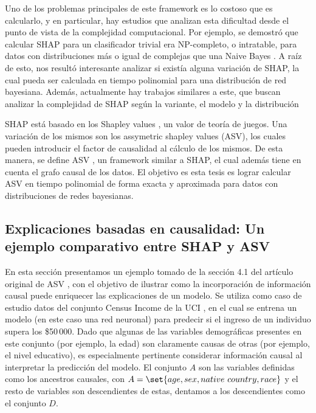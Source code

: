 Uno de los problemas principales de este framework es lo costoso que es calcularlo, y en particular, hay estudios que analizan esta dificultad desde el punto de vista de la complejidad computacional. Por ejemplo, se demostró que calcular SHAP para un clasificador trivial era NP-completo, o intratable, para datos con distribuciones más o igual de complejas que una Naive Bayes \cite{arenas2021tractability}.
A raíz de esto, nos resultó interesante analizar si existía alguna variación de SHAP, la cual pueda ser calculada en tiempo polinomial para una distribución de red bayesiana. Además, actualmente hay trabajos similares a este, que buscan analizar la complejidad de SHAP según la variante, el modelo y la distribución \cite{marzouk2025computationaltractabilitymanyshapley} %

SHAP está basado en los Shapley values \cite{shapley1953value}, un valor de teoría de juegos.  Una variación de los mismos son los assymetric shapley values (ASV), los cuales pueden introducir el factor de causalidad al cálculo de los mismos. De esta manera, se define ASV \cite{frye2019asymmetric}, un framework similar a SHAP, el cual además tiene en cuenta el grafo causal de los datos. El objetivo es esta tesis es lograr calcular ASV en tiempo polinomial de forma exacta y aproximada para datos con distribuciones de redes bayesianas.

\subsection{Explicaciones basadas en causalidad: Un ejemplo comparativo entre SHAP y ASV} \label{asvCaseExample}

En esta sección presentamos un ejemplo tomado de la sección 4.1 del artículo original de ASV \cite{frye2019asymmetric}, con el objetivo de ilustrar como la incorporación de información causal puede enriquecer las explicaciones de un modelo. Se utiliza como caso de estudio datos del conjunto Census Income de la UCI \cite{dua2017uci}, en el cual se entrena un modelo (en este caso una red neuronal) para predecir si el ingreso de un individuo supera los \$50\,000. Dado que algunas de las variables demográficas presentes en este conjunto (por ejemplo, la edad) son claramente causas de otras (por ejemplo, el nivel educativo), es especialmente pertinente considerar información causal al interpretar la predicción del modelo. El conjunto $A$ son las variables definidas como los ancestros causales, con $A= \set{age, sex, native \ country, race}$ y el resto de variables son descendientes de estas, dentamos a los descendientes como el conjunto $D$. 

